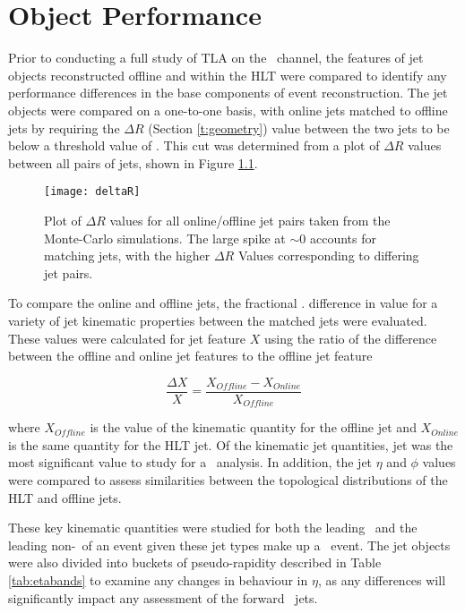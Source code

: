 \chapter{Object Performance}\label{c:OP}

Prior to conducting a full study of TLA on the \VBFHBB\, channel, the features of jet objects reconstructed offline and within the HLT were compared to identify any performance differences in the base components of event reconstruction. The jet objects were compared on a one-to-one basis, with online jets matched to offline jets by requiring the $\Delta R$ (Section \ref{t:geometry}) value between the two jets to be below a threshold value of \DELTARTHRESHOLD. This cut was determined from a plot of $\Delta R$ values between all pairs of jets, shown in Figure \ref{f:deltaR}.

\begin{figure}[h]
	\centering
	\texttt{[image: deltaR]}
	\caption[$\Delta R$ values for online/offline jet pairs in Monte-Carlo simulation]{Plot of $\Delta R$ values for all online/offline jet pairs taken from the Monte-Carlo simulations. The large spike at $\sim0$ accounts for matching jets, with the higher $\Delta R$ Values corresponding to differing jet pairs.}
	\label{f:deltaR}
\end{figure}
To compare the online and offline jets, the fractional
. difference in value for a variety of jet kinematic properties between the matched jets were evaluated. These values were calculated for jet feature $X$ using the ratio of the difference between the offline and online jet features to the offline jet feature

	\begin{equation}
	\frac{\Delta X}{X} = \frac{X_{Offline} - X_{Online}}{X_{Offline}}
	\end{equation}

	where $X_{Offline}$ is the value of the kinematic quantity for the offline jet and $X_{Online}$ is the same quantity for  the HLT jet. Of the kinematic jet quantities, jet \pt was the most significant value to study for a \VBFHBB\ analysis. In addition, the jet $\eta$ and $\phi$ values were compared to assess similarities between the topological distributions of the HLT and offline jets.

	These key kinematic quantities were studied for both the leading \bjet\ and the leading non-\bjet\, of an event given these jet types make up a \VBFHBB\ event. The jet objects were also divided into buckets of pseudo-rapidity described in Table \ref{tab:etabands} to examine any changes in behaviour in $\eta$, as any differences will significantly impact any assessment of the forward \VBFHBB\ jets.

